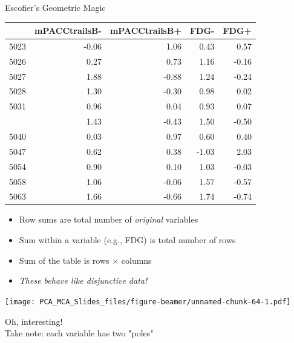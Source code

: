 \documentclass[
  ignorenonframetext,
]{beamer}
\providecommand{\tightlist}{%
  \setlength{\itemsep}{0pt}\setlength{\parskip}{0pt}}
\begin{document}
\begin{frame}{Escofier's Geometric Magic}
\protect\hypertarget{escofiers-geometric-magic-2}{}

\begin{table}[H]
\centering\begingroup\fontsize{7}{9}\selectfont

\begin{tabular}{lrrrr}
\toprule
  & mPACCtrailsB- & mPACCtrailsB+ & FDG- & FDG+\\
\midrule
5023 & -0.06 & 1.06 & 0.43 & 0.57\\
5026 & 0.27 & 0.73 & 1.16 & -0.16\\
5027 & 1.88 & -0.88 & 1.24 & -0.24\\
5028 & 1.30 & -0.30 & 0.98 & 0.02\\
5031 & 0.96 & 0.04 & 0.93 & 0.07\\
\addlinespace
5037 & 1.43 & -0.43 & 1.50 & -0.50\\
5040 & 0.03 & 0.97 & 0.60 & 0.40\\
5047 & 0.62 & 0.38 & -1.03 & 2.03\\
5054 & 0.90 & 0.10 & 1.03 & -0.03\\
5058 & 1.06 & -0.06 & 1.57 & -0.57\\
5063 & 1.66 & -0.66 & 1.74 & -0.74\\
\bottomrule
\end{tabular}\endgroup{}
\end{table}

\begin{itemize}[<+->]
\tightlist
\item
  Row sums are total number of \emph{original} variables
\item
  Sum within a variable (e.g., FDG) is total number of rows
\item
  Sum of the table is rows \(\times\) columns
\item
  \emph{These behave like disjunctive data!}
\end{itemize}

\end{frame}

\begin{frame}

\texttt{[image: PCA\_MCA\_Slides\_files/figure-beamer/unnamed-chunk-64-1.pdf]}

\begin{center}Oh, interesting!\\
Take note: each variable has two "poles"\end{center}

\end{frame}
\end{document}
